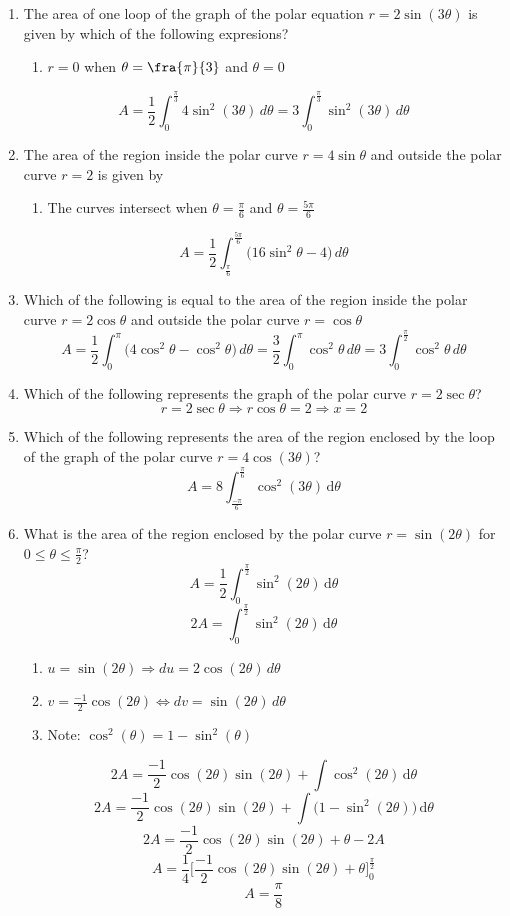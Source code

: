\documentclass[12pt]{article}
\begin{document}
\begin{enumerate}
	\item The area of one loop of the graph of the polar equation $r=2\sin(3\theta)$ is given by which of the following expresions?
	      \begin{enumerate}
	      	\item $r=0$ when $\theta = \fra{\pi}{3}$ and $\theta = 0$
	      \end{enumerate}
	      $$A = \frac{1}{2} \int_{0}^{\frac{\pi}{3}} 4\sin^2(3\theta) \, d\theta = \boxed{3\int_{0}^{\frac{\pi}{3}} \sin^2(3\theta) \, d\theta}$$
	\item The area of the region inside the polar curve $r=4\sin\theta$ and outside the polar curve $r=2$ is given by
	      \begin{enumerate}
	      	\item The curves intersect when $\theta = \frac{\pi}{6}$ and $\theta = \frac{5\pi}{6}$
	      \end{enumerate}
	      $$\boxed{A = \frac{1}{2} \int_{\frac{\pi}{6}}^{\frac{5\pi}{6}} \big(16\sin^2\theta -4 \big)\, d\theta}$$
	\item Which of the following is equal to the area of the region inside the polar curve $r=2\cos\theta$ and outside the polar curve $r=\cos\theta$
	      $$A=\frac{1}{2}\int_{0}^{\pi} \big(4\cos^2\theta - \cos^2\theta\big)\, d\theta = \frac{3}{2} \int_{0}^{\pi} \cos^2\theta \, d\theta = \boxed{3\int_{0}^{\frac{\pi}{2}}\cos^2\theta \, d\theta}$$
	\item Which of the following represents the graph of the polar curve $r=2\sec\theta$?
	      $$r=2\sec\theta \Longrightarrow r\cos\theta = 2 \Longrightarrow \boxed{x=2}$$
	\item Which of the following represents the area of the region enclosed by the loop of the graph of the polar curve $r=4\cos(3\theta)$?
	      $$\boxed{A = 8 \int_{\frac{-\pi}{6}}^{\frac{\pi}{6}} \cos^2(3\theta)\, \mathrm{d}\theta}$$
	\item What is the area of the region enclosed by the polar curve $r=\sin(2\theta)$ for $0 \leq \theta\leq \frac{\pi}{2}$?
	      $$A = \frac{1}{2}\int_{0}^{\frac{\pi}{2}} \sin^2(2\theta)\, \mathrm{d}\theta$$
	      $$2A = \int_{0}^{\frac{\pi}{2}} \sin^2(2\theta)\, \mathrm{d}\theta$$
	      \begin{enumerate}
	      	\item $u = \sin (2\theta) \Longrightarrow du =2\cos(2\theta) \, d\theta$
	      	\item $v = \frac{-1}{2}\cos(2\theta) \Leftrightarrow dv = \sin(2\theta)\, d\theta$
	      	\item Note: $\cos^2 (\theta) = 1 - \sin^2(\theta)$
	      \end{enumerate}
	      $$2A = \frac{-1}{2} \cos(2\theta)\sin(2\theta) + \int \cos^2(2\theta) \, \mathrm{d}\theta$$
	      $$2A = \frac{-1}{2} \cos(2\theta)\sin(2\theta) + \int \big(1-\sin^2(2\theta)\big) \, \mathrm{d}\theta$$
	      $$2A = \frac{-1}{2} \cos(2\theta)\sin(2\theta) + \theta -2A$$
	      $$A = \frac{1}{4}\bigg[\frac{-1}{2} \cos(2\theta)\sin(2\theta) + \theta\bigg]_{0}^{\frac{\pi}{2}}$$
	      $$A = \boxed{\frac{\pi}{8}}$$
\end{enumerate}
\end{document}
